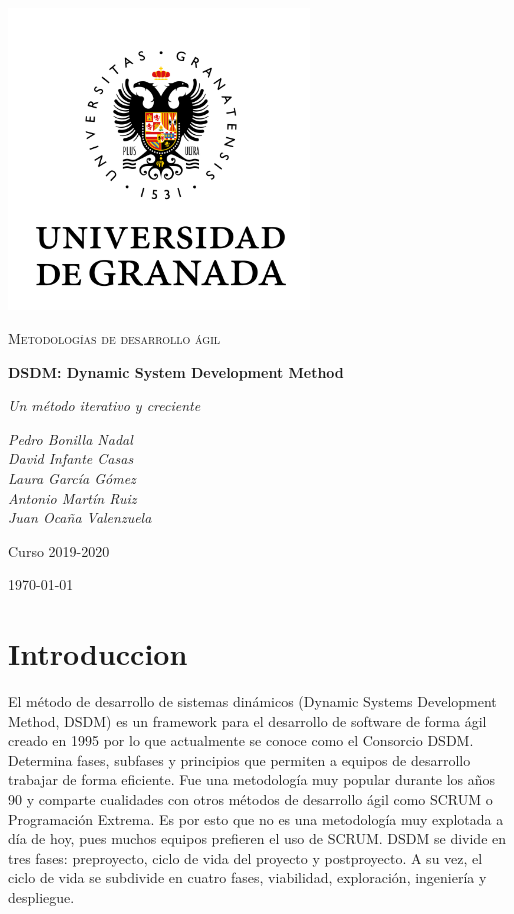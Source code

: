 \documentclass[12pt,a4paper]{article}
\begin{document}
\pgfplotsset{compat=1.16}
\begin{titlepage}
  \centering
  \includegraphics[width=0.6\textwidth]{ugr.png}\par\vspace{1cm}
  {\scshape\large Metodologías de desarrollo ágil \par} \vspace{1cm}
  {\huge\bfseries DSDM: Dynamic System Development Method \par}
  \vspace{0.4cm}
  {\large\itshape Un método iterativo y creciente\\}
  \vspace{0.6cm}
  {\large\itshape  Pedro Bonilla Nadal \\ David Infante Casas \\ Laura García Gómez \\ Antonio Martín Ruiz \\ Juan Ocaña Valenzuela  \par} \vspace{1.00cm}
  Curso 2019-2020 \\
  \vfill

  {\large \today\par}
\end{titlepage}

\tableofcontents
\newpage

\setlength{\parskip}{10pt}
\justify

\section{Introduccion}
El método de desarrollo de sistemas dinámicos (Dynamic Systems Development Method, DSDM) es un framework para el desarrollo de software de forma ágil creado en 1995 por lo que actualmente se conoce como el Consorcio DSDM. Determina fases, subfases y principios que permiten a equipos de desarrollo trabajar de forma eficiente. Fue una metodología muy popular durante los años 90 y comparte cualidades con otros métodos de desarrollo ágil como SCRUM o Programación Extrema. Es por esto que no es una metodología muy explotada a día de hoy, pues muchos equipos prefieren el uso de SCRUM. DSDM se divide en tres fases: preproyecto, ciclo de vida del proyecto y postproyecto. A su vez, el ciclo de vida se subdivide en cuatro fases, viabilidad, exploración, ingeniería y despliegue.
\end{document}
